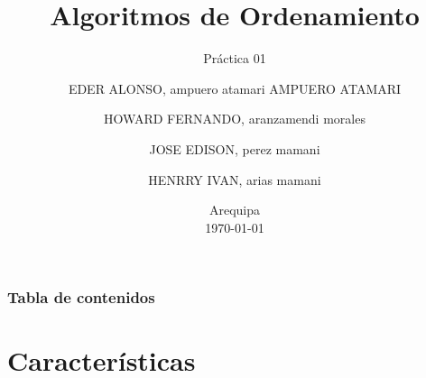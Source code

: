 \documentclass[
	11pt, %
]{beamer}
\title[ALG ORD]{Algoritmos de Ordenamiento} %
\subtitle{Práctica 01} %
\author[ ]{
EDER ALONSO, ampuero atamari AMPUERO ATAMARI\\ \and
HOWARD FERNANDO, aranzamendi morales\\ \and
JOSE EDISON, perez mamani\\ \and
HENRRY IVAN, arias mamani}
\institute[UC]{Universidad Nacional San Agustín de Arequipa \\ \smallskip \textit{ }} %
\date[\today]{Arequipa \\ \today} %
\begin{document}

\begin{frame}
	\titlepage %
\end{frame}



\begin{frame}
	\frametitle{Tabla de contenidos} %
	
	\tableofcontents %
\end{frame}


\section{Características} %
\end{document}
